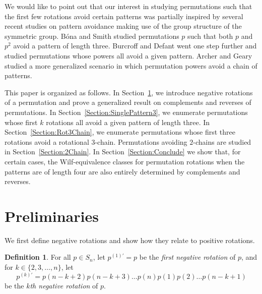 \documentclass[11pt]{article}
\theoremstyle{definition}
\newtheorem{definition}[theorem]{Definition}
\numberwithin{equation}{section}
\begin{document}
We would like to point out that our interest in studying permutations such that the first few rotations avoid certain patterns was partially inspired by several recent 
studies on pattern avoidance making use of the group structure of the symmetric group. B\'{o}na and Smith \cite{BonaSmith2019} studied permutations $p$ such that both $p$ and $p^2$ avoid a pattern of length three. Burcroff and Defant \cite{BurcroffDefant2020} went one step further and studied permutations whose powers all avoid a given pattern. Archer and Geary \cite{ArcherGeary2023} studied a more generalized scenario in which permutation powers avoid a chain of patterns.

This paper is organized as follows. In Section~\ref{Section:Pre}, we introduce negative rotations of a permutation and prove a generalized result on complements and reverses of permutations. In Section~\ref{Section:SinglePattern3}, we enumerate permutations whose first $k$ rotations all avoid a given pattern of length three. In Section~\ref{Section:Rot3Chain}, we enumerate permutations whose first three rotations avoid a rotational 3-chain. Permutations avoiding $2$-chains are studied in Section~\ref{Section:2Chain}. In Section~\ref{Section:Conclude} we show that, for certain cases, the Wilf-equivalence classes for permutation rotations when the patterns are of length four are also entirely determined by complements and reverses.

\section{Preliminaries}\label{Section:Pre}
We first define negative rotations and show how they relate to positive rotations.

\begin{definition}
    For all $p\in S_n$, let $p^{(1)'}=p$ be the \textit{first negative rotation} of $p$, and for $k\in\{2,3,\ldots,n\}$, let
\[p^{(k)'}=p(n-k+2)p(n-k+3)\ldots p(n) p(1) p(2)\ldots p(n-k+1)\] be the \textit{$k$th negative rotation} of $p$.
\end{definition}
\end{document}
